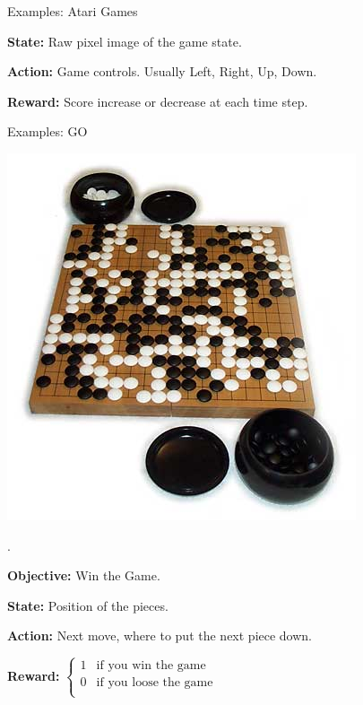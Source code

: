 \documentclass{beamer}
\begin{document}
\begin{frame}{Examples: Atari Games}
\begin{minipage}{7cm}
			\textbf{State:} Raw pixel image of the game state.
			
			\textbf{Action:} Game controls. Usually Left, Right, Up, Down.
			
			\textbf{Reward:} Score increase or decrease at each time step.
		\end{minipage}
	\end{frame}
	
	\begin{frame}{Examples: GO}
		\begin{minipage}{3cm}
			\centering
			\includegraphics[width=\textwidth]{go.jpg}
		\end{minipage}%
		\begin{minipage}{1cm}
			.
		\end{minipage}%
		\begin{minipage}{7cm}
			\textbf{Objective:} Win the Game.
			
			\textbf{State:} Position of the pieces.
			
			\textbf{Action:} Next move, where to put the next piece down.
			
			\textbf{Reward:} $\begin{cases}
			1 & \text{if you win the game}   \\
			0 & \text{if you loose the game} \\
			\end{cases}$
		\end{minipage}
	\end{frame}
	
\end{document}
